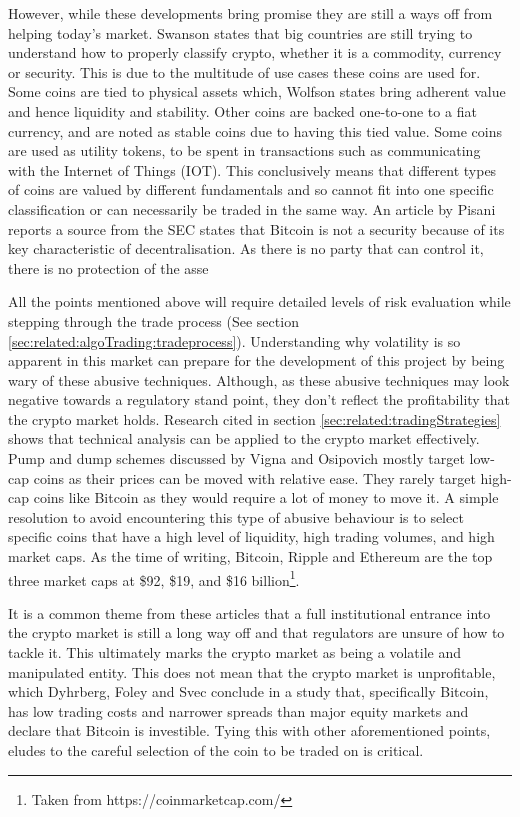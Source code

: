 However, while these developments bring promise they are still a ways off from helping today's market. Swanson \cite{ART:ELLIS:2018} states that big countries are still trying to understand how to properly classify crypto, whether it is a commodity, currency or security. This is due to the multitude of use cases these coins are used for. Some coins are tied to physical assets which, Wolfson \cite{ART:WOLFSON:2018} states bring adherent value and hence liquidity and stability. Other coins are backed one-to-one to a fiat currency, and are noted as stable coins due to having this tied value. Some coins are used as utility tokens, to be spent in transactions such as communicating with the Internet of Things (IOT). This conclusively means that different types of coins are valued by different fundamentals and so cannot fit into one specific classification or can necessarily be traded in the same way. An article by Pisani reports a source from the SEC states that Bitcoin is not a security because of its key characteristic of decentralisation. As there is no party that can control it, there is no protection of the asse

All the points mentioned above will require detailed levels of risk evaluation while stepping through the trade process (See section \ref{sec:related:algoTrading:tradeprocess}). Understanding why volatility is so apparent in this market can prepare for the development of this project by being wary of these abusive techniques. Although, as these abusive techniques may look negative towards a regulatory stand point, they don't reflect the profitability that the crypto market holds. Research cited in section \ref{sec:related:tradingStrategies} shows that technical analysis can be applied to the crypto market effectively. Pump and dump schemes discussed by Vigna and Osipovich mostly target low-cap coins as their prices can be moved with relative ease. They rarely target high-cap coins like Bitcoin as they would require a lot of money to move it. A simple resolution to avoid encountering this type of abusive behaviour is to select specific coins that have a high level of liquidity, high trading volumes, and high market caps. As the time of writing, Bitcoin, Ripple and Ethereum are the top three market caps at \$92, \$19, and \$16 billion\footnote{Taken from https://coinmarketcap.com/}.  

It is a common theme from these articles that a full institutional entrance into the crypto market is still a long way off and that regulators are unsure of how to tackle it. This ultimately marks the crypto market as being a volatile and manipulated entity. This does not mean that the crypto market is unprofitable, which Dyhrberg, Foley and Svec conclude in a study that, specifically Bitcoin, has low trading costs and narrower spreads than major equity markets and declare that Bitcoin is investible. Tying this with other aforementioned points, eludes to the careful selection of the coin to be traded on is critical.  

